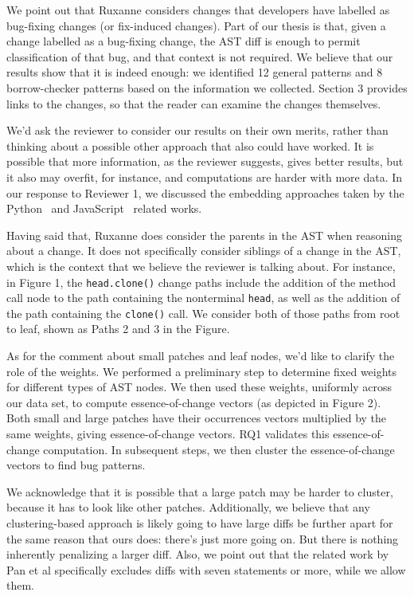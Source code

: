 \documentclass{article}
\begin{document}
We point out that Ruxanne considers changes that developers have labelled as bug-fixing changes (or fix-induced changes). Part of our thesis is that, given a change labelled as a bug-fixing change, the AST diff is enough to permit classification of that bug, and that context is not required. We believe that our results show that it is indeed enough: we identified 12 general patterns and 8 borrow-checker patterns based on the information we collected.  Section 3 provides links to the changes, so that the reader can examine the changes themselves. 

We'd ask the reviewer to consider our results on their own merits, rather than thinking about a possible other approach that also could have worked. It is possible that more information, as the reviewer suggests, gives better results, but it also may overfit, for instance, and computations are harder with more data. In our response to Reviewer 1, we discussed the embedding approaches taken by the Python~\cite{yang2022mining} and JavaScript~\cite{hanam2016discovering} related works.

Having said that, Ruxanne does consider the parents in the AST when reasoning about a change. It does not specifically consider siblings of a change in the AST, which is the context that we believe the reviewer is talking about. For instance, in Figure 1, the \verb+head.clone()+ change paths include the addition of the method call node to the path containing the nonterminal \verb+head+, as well as the addition of the path containing the \verb+clone()+ call. We consider both of those paths from root to leaf, shown as Paths 2 and 3 in the Figure.

As for the comment about small patches and leaf nodes, we'd like to clarify the role of the weights. We performed a preliminary step to determine fixed weights for different types of AST nodes. We then used these weights, uniformly across our data set, to compute essence-of-change vectors (as depicted in Figure 2). Both small and large patches have their occurrences vectors multiplied by the same weights, giving essence-of-change vectors. RQ1 validates this essence-of-change computation. In subsequent steps, we then cluster the essence-of-change vectors to find bug patterns. 

We acknowledge that it is possible that a large patch may be harder to cluster, because it has to look like other patches.  Additionally, we believe that any clustering-based approach is likely going to have large diffs be further apart for the same reason that ours does: there's just more going on. But there is nothing inherently penalizing a larger diff. Also, we point out that the related work by Pan et al specifically excludes diffs with seven statements or more, while we allow them. \\ \\
\end{document}
